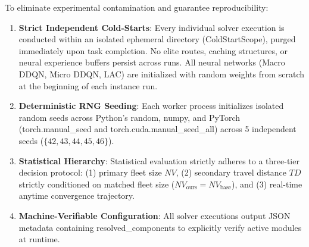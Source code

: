 \documentclass{ieeeaccess}
\begin{document}
To eliminate experimental contamination and guarantee reproducibility:
\begin{enumerate}
    \item \textbf{Strict Independent Cold-Starts}: Every individual solver execution is conducted within an isolated ephemeral directory (\textsf{\small ColdStartScope}), purged immediately upon task completion. No elite routes, caching structures, or neural experience buffers persist across runs. All neural networks (Macro DDQN, Micro DDQN, LAC) are initialized with random weights from scratch at the beginning of each instance run.
    \item \textbf{Deterministic RNG Seeding}: Each worker process initializes isolated random seeds across Python's \textsf{\small random}, \textsf{\small numpy}, and PyTorch (\textsf{\small torch.manual\_seed} and \textsf{\small torch.cuda.manual\_seed\_all}) across 5 independent seeds ($\{42, 43, 44, 45, 46\}$).
    \item \textbf{Statistical Hierarchy}: Statistical evaluation strictly adheres to a three-tier decision protocol: (1) primary fleet size $NV$, (2) secondary travel distance $TD$ strictly conditioned on matched fleet size ($NV_{\text{ours}} = NV_{\text{base}}$), and (3) real-time anytime convergence trajectory.
    \item \textbf{Machine-Verifiable Configuration}: All solver executions output JSON metadata containing \textsf{\small resolved\_components} to explicitly verify active modules at runtime.
\end{enumerate}
\end{document}
